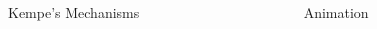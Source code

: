 \documentclass{beamer}
\begin{document}
\begin{frame}{}
\begin{columns}[t]
\begin{column}{0.3\linewidth}
\begin{block}{Kempe's Mechanisms}
\end{block}


\end{column}%

\begin{column}{0.3\linewidth}

\begin{block}{Animation}
\vspace{0.5em}


\end{block}
\end{column}
\end{columns}
\end{frame}
\end{document}
